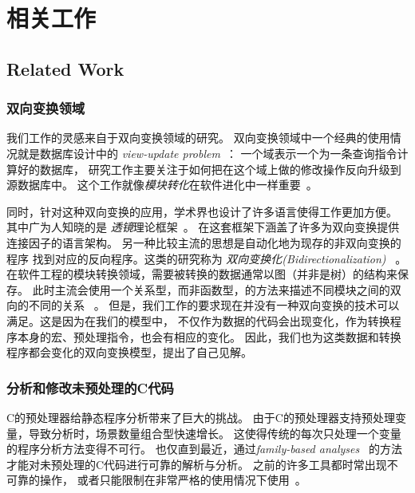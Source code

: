 \chapter{相关工作}
\section{Related Work}
\label{sec:related}

\subsection{双向变换领域}
我们工作的灵感来自于双向变换领域的研究。
双向变换领域中一个经典的使用情况就是数据库设计中的
\emph{view-update problem}~\parencite{BaSp81,DaBe82,Hegner90,Cui2000,Fegaras2010}：
一个域表示一个为一条查询指令计算好的数据库，
研究工作主要关注于如何把在这个域上做的修改操作反向升级到源数据库中。
这个工作就像\emph{模块转化}在软件进化中一样重要~\parencite{YuLHHKM12,XiLHZTM07}。

同时，针对这种双向变换的应用，学术界也设计了许多语言使得工作更加方便。
其中广为人知晓的是 \emph{透镜}理论框架~\parencite{HuMT04,MuHT04aplas,Foster:2007,BoFPPS08,FoPP08,WaGMH10,Diskin2011,Hofmann2012,FoMV12,RaLFC13}。
在这套框架下涵盖了许多为双向变换提供连接因子的语言架构。
另一种比较主流的思想是自动化地为现存的非双向变换的程序
找到对应的反向程序。这类的研究称为 \emph{双向变换化(Bidirectionalization)}
~\parencite{MaHNHT07,Voigtlander09bff,voigtlander2010combining,WaGW11,VoHMW13,WaGMH13,MaWa13,MaWa13ppdp,WaNa14,MaWa14}。
在软件工程的模块转换领域，需要被转换的数据通常以图（并非是树）的结构来保存。
此时主流会使用一个关系型，而非函数型，的方法来描述不同模块之间的双向的不同的关系
~\parencite{qvt,Stevens2010,Schurr1994,Schurr2008,HiHIKMN10,Hidaka:2011}。
但是，我们工作的要求现在并没有一种双向变换的技术可以满足。这是因为在我们的模型中，
不仅作为数据的代码会出现变化，作为转换程序本身的宏、预处理指令，也会有相应的变化。
因此，我们也为这类数据和转换程序都会变化的双向变换模型，提出了自己见解。


\subsection{分析和修改未预处理的C代码}
C的预处理器给静态程序分析带来了巨大的挑战。
由于C的预处理器支持预处理变量，导致分析时，场景数量组合型快速增长。
这使得传统的每次只处理一个变量的程序分析方法变得不可行。
也仅直到最近，通过\emph{family-based
analyses}~\parencite{Kastner2011,Gazzillo2012,Liebig2013}
的方法才能对未预处理的C代码进行可靠的解析与分析。
之前的许多工具都时常出现不可靠的操作，
或者只能限制在非常严格的使用情况下使用~\parencite{Baxter2001,Garrido2005,Padioleau2009}。

